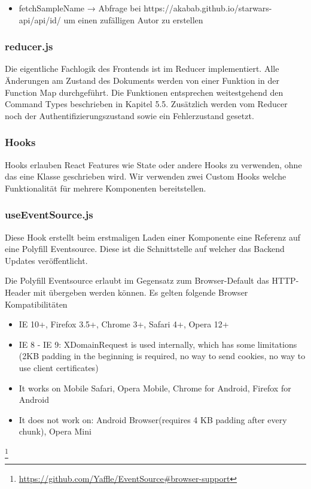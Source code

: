 \begin{itemize}
    \item fetchSampleName → Abfrage bei https://akabab.github.io/starwars-api/api/id/ um einen zufälligen Autor zu erstellen
\end{itemize}

\subsubsection*{reducer.js}
Die eigentliche Fachlogik des Frontends ist im Reducer implementiert.
Alle Änderungen am Zustand des Dokuments werden von einer Funktion in der Function Map durchgeführt.
Die Funktionen entsprechen weitestgehend den Command Types beschrieben in Kapitel 5.5.
Zusätzlich werden vom Reducer noch der Authentifizierungszustand sowie ein Fehlerzustand gesetzt.

\subsubsection{Hooks}
Hooks erlauben React Features wie State oder andere Hooks zu verwenden, ohne das eine Klasse geschrieben wird.
Wir verwenden zwei Custom Hooks welche Funktionalität für mehrere Komponenten bereitstellen.

\subsubsection*{useEventSource.js}
Diese Hook erstellt beim erstmaligen Laden einer Komponente eine Referenz auf eine Polyfill Eventsource.
Diese ist die Schnittstelle auf welcher das Backend Updates veröffentlicht.

Die Polyfill Eventsource erlaubt im Gegensatz zum Browser-Default das HTTP-Header mit übergeben werden können.
Es gelten folgende Browser Kompatibilitäten

\begin{itemize}
    \item IE 10+, Firefox 3.5+, Chrome 3+, Safari 4+, Opera 12+
    \item IE 8 - IE 9: XDomainRequest is used internally, which has some limitations (2KB padding in the beginning is required, no way to send cookies, no way to use client certificates)
    \item It works on Mobile Safari, Opera Mobile, Chrome for Android, Firefox for Android
    \item It does not work on: Android Browser(requires 4 KB padding after every chunk), Opera Mini
\end{itemize}
\footnote{\url{https://github.com/Yaffle/EventSource#browser-support}}

